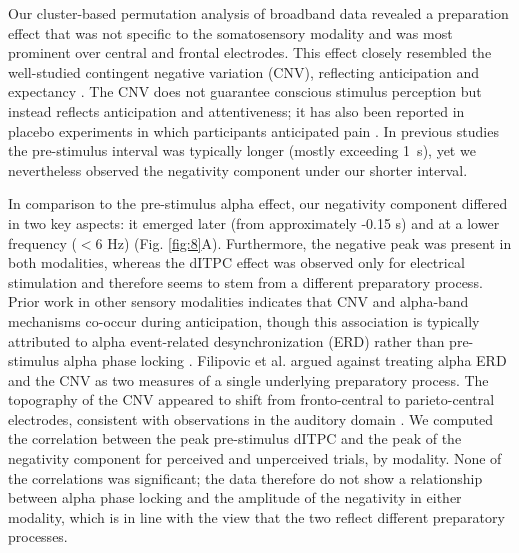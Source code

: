 \documentclass[11pt,a4paper,onecolumn]{article}
\begin{document}
\vspace{3pt}

Our cluster-based permutation analysis of broadband data revealed a preparation effect that was not specific to the somatosensory modality and was most prominent over central and frontal electrodes. This effect closely resembled the well-studied contingent negative variation (CNV), reflecting anticipation and expectancy \citep{walterCONTINGENTNEGATIVEVARIATION1964, desmedtSlowPotentialShifts1979, prevecMeasurementLightTouch1991}. The CNV does not guarantee conscious stimulus perception but instead reflects anticipation and attentiveness; it has also been reported in placebo experiments in which participants anticipated pain \citep{piedimonteMeasuringExpectationPain2017,babiloniContingentNegativeVariation2005}. In previous studies the pre-stimulus interval was typically longer (mostly exceeding 1~s), yet we nevertheless observed the negativity component under our shorter interval. 

In comparison to the pre-stimulus alpha effect, our negativity component differed in two key aspects: it emerged later (from approximately -0.15 s) and at a lower frequency ($<$6 Hz) (Fig. \ref{fig:8}A). Furthermore, the negative peak was present in both modalities, whereas the dITPC effect was observed only for electrical stimulation and therefore seems to stem from a different preparatory process. Prior work in other sensory modalities indicates that CNV and alpha-band mechanisms co-occur during anticipation, though this association is typically attributed to alpha event-related desynchronization (ERD) rather than pre-stimulus alpha phase locking \citep{benderSpecificTaskAnticipation2004, bidet-cauletDynamicsAnticipatoryMechanisms2012,filipovicUncouplingContingentNegative2001}. Filipovic et al. \cite{filipovicUncouplingContingentNegative2001} argued against treating alpha ERD and the CNV as two measures of a single underlying preparatory process. The topography of the CNV appeared to shift from fronto-central to parieto-central electrodes, consistent with observations in the auditory domain \citep{benderSpecificTaskAnticipation2004}.
We computed the correlation between the peak pre-stimulus dITPC and the peak of the negativity component for perceived and unperceived trials, by modality. None of the correlations was significant; the data therefore do not show a relationship between alpha phase locking and the amplitude of the negativity in either modality, which is in line with the view that the two reflect different preparatory processes. 
\end{document}
